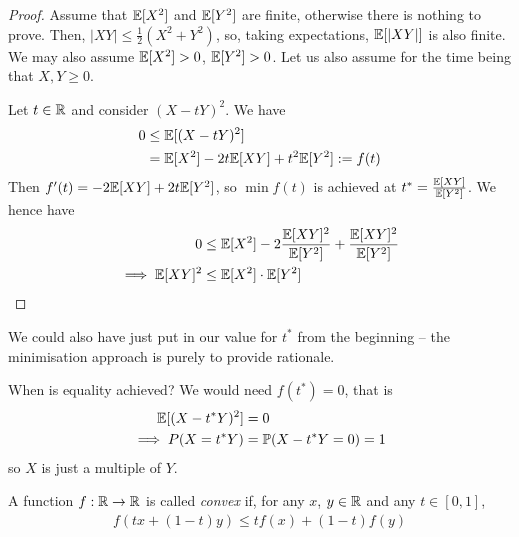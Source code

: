 \documentclass{../template/note}
\begin{document}
    \begin{proof}
        Assume that \(\mathbb E[X^2]\) and \(\mathbb E[Y^2]\) are finite, otherwise there is nothing to prove. Then, \(|XY| \leq \frac 1 2 (X^2 + Y^2)\), so, taking expectations, \(\mathbb E[|XY|]\) is also finite. We may also assume \(\mathbb E[X^2] > 0\), \(\mathbb E[Y^2] > 0\). Let us also assume for the time being that \(X, Y \geq 0\).

        Let \(t \in \mathbb R\) and consider \((X-tY)^2\). We have
        \begin{align*}
            0 &\leq \mathbb E[(X-tY)^2] \\
            &= \mathbb E[X^2] - 2t\mathbb E[XY] + t^2\mathbb E[Y^2] := f(t)
        \end{align*}
        Then \(f'(t) = -2\mathbb E[XY] + 2t\mathbb E[Y^2]\), so \(\min f(t)\) is achieved at \(t^* = \frac{\mathbb E[XY]}{\mathbb E[Y^2]}\). We hence have
        \begin{align*}
            0 &\leq \mathbb E[X^2] - 2\frac{\mathbb E[XY]^2}{\mathbb E[Y^2]} + \frac{\mathbb E[XY]^2}{\mathbb E[Y^2]} \\
            \implies \mathbb E[XY]^2 &\leq \mathbb E[X^2] \cdot \mathbb E[Y^2]
        \end{align*}
    \end{proof}
    
    \begin{remark*}
        We could also have just put in our value for \(t^*\) from the beginning -- the minimisation approach is purely to provide rationale.
    \end{remark*}
    
    \begin{remark*}
        When is equality achieved? We would need \(f(t^*) = 0\), that is
        \begin{align*}
            \mathbb E[(X - t^*Y)^2] &= 0 \\
            \implies P(X = t^*Y) &= \mathbb P(X - t^*Y = 0) = 1
        \end{align*}
        so \(X\) is just a multiple of \(Y\).        
    \end{remark*}
    
    \begin{definition}[Convexity]
        A function \(f: \mathbb R \to \mathbb R\) is called \emph{convex} if, for any \(x\), \(y \in \mathbb R\) and any \(t \in [0, 1]\),
        \begin{align*}
            f(tx + (1-t)y) \leq tf(x) + (1-t)f(y)
        \end{align*}
    \end{definition}
    
\end{document}
